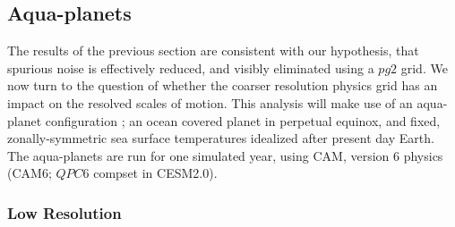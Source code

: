 \documentclass{agujournal}
\begin{document}
\subsection{Aqua-planets}\label{sec:aquaplanet}

The results of the previous section are consistent with our hypothesis, that spurious noise is effectively reduced, and visibly eliminated using a $pg2$ grid. We now turn to the question of whether the coarser resolution physics grid has an impact on the resolved scales of motion. This analysis will make use of an aqua-planet configuration \citep{NH2000ASL,MWO2016JAMES}; an ocean covered planet in perpetual equinox, and fixed, zonally-symmetric sea surface temperatures idealized after present day Earth. The aqua-planets are run for one simulated year, using CAM, version 6 physics (CAM6; $QPC6$ compset in CESM2.0).

\subsubsection{Low Resolution}\label{sec:lowres}
\end{document}
